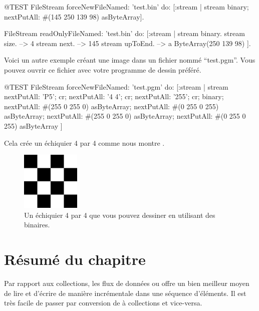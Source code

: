\documentclass[a4paper,10pt,twoside]{book}
\begin{document}
\begin{code}{@TEST}
FileStream
  forceNewFileNamed: 'test.bin'
  do: [:stream |
          stream
            binary;
            nextPutAll: #(145 250 139 98) asByteArray].

FileStream
  readOnlyFileNamed: 'test.bin'
  do: [:stream |
          stream binary.
          stream size.         --> 4
          stream next.         --> 145
          stream upToEnd. --> a ByteArray(250 139 98)
      ].
\end{code}

Voici un autre exemple cr\'eant une image dans un fichier nomm\'e
``test.pgm''. Vous pouvez ouvrir ce fichier avec votre programme de
dessin pr\'ef\'er\'e.

\begin{code}{@TEST}
FileStream
  forceNewFileNamed: 'test.pgm' 
  do: [:stream |
	stream
		nextPutAll: 'P5'; cr;
		nextPutAll: '4 4'; cr;
		nextPutAll: '255'; cr;
		binary;
		nextPutAll: #(255 0 255 0) asByteArray;
		nextPutAll: #(0 255 0 255) asByteArray;
		nextPutAll: #(255 0 255 0) asByteArray;
		nextPutAll: #(0 255 0 255) asByteArray
	]
\end{code}

Cela cr\'ee un \'echiquier 4 par 4 comme nous montre .

\begin{figure}[!ht]
\centerline{\includegraphics[width=0.25\textwidth]{checkerboard4x4}}
\caption{Un \'echiquier 4 par 4 que vous pouvez dessiner en utilisant des \streams binaires.}
\label{fig:checkerboard4x4}
\vspace{.2in}
\end{figure}

\section{R\'esum\'e du chapitre}

Par rapport aux collections, les flux de donn\'ees ou \streams offre
un bien meilleur moyen de lire et d'\'ecrire de mani\`ere
incr\'ementale dans une s\'equence d'\'el\'ements.
Il est tr\`es facile de passer par conversion de \streams \`a collections et vice-versa.
\end{document}
